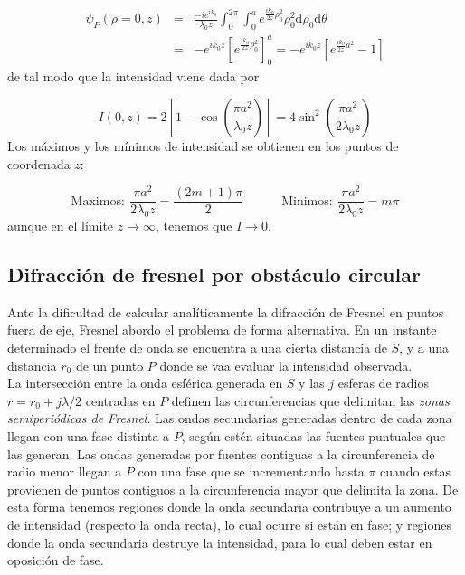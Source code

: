 \documentclass[12pt,a4paper]{book}
\numberwithin{equation}{section}
\numberwithin{figure}{section}
\newcommand{\tquad}{\quad \quad \quad}
\newcommand{\parentesis}[1]{\left( #1  \right)}
\newcommand{\ccorchetes}[1]{\left[ #1  \right]}
\newcommand{\D}{\mathrm{d}}
\newcommand{\1}{_{(1)}}
\newcommand{\2}{_{(2)}}
\theoremstyle{definition}
\begin{document}
\begin{eqnarray}
    \psi_P (\rho=0,z) &  =   & \frac{-ie^{ik_0}}{\lambda_0z} \int_0^{2\pi} \int_0^a e^{\frac{ik_0}{2z} \rho^2_0} \rho_0^2 \D \rho_0 \D \theta \\&  =  &  -e^{ik_0z} \ccorchetes{e^{\frac{ik_0}{2z}\rho^2_0}}_0^a = - e^{ik_0z }\ccorchetes{e^{\frac{ik_0}{2z}a^2}-1}
\end{eqnarray}
de tal modo que la intensidad viene dada por

\begin{equation}
    I(0,z) = 2 \ccorchetes{1-\cos \parentesis{\frac{\pi a^2}{\lambda_0 z}}} = 4 \sin^2 \parentesis{\frac{\pi a^2}{2 \lambda_0 z}}
\end{equation}
Los máximos y los mínimos de intensidad se obtienen en los puntos de coordenada $z$:

\begin{equation}
  \mathrm{Maximos}: \  \frac{\pi a^2}{2\lambda_0z} = \frac{(2m+1)\pi}{2} \tquad 
  \mathrm{Minimos}: \  \frac{\pi a^2}{2\lambda_0z} = m \pi
\end{equation}
aunque en el límite $z\rightarrow \infty$, tenemos que $I\rightarrow 0$. 


\subsection{Difracción de fresnel por obstáculo circular}

Ante la dificultad de calcular analíticamente la difracción de Fresnel en puntos fuera de eje, Fresnel abordo el problema de forma alternativa. En un instante determinado el frente de onda se encuentra a una cierta distancia de $S$, y a una distancia $r_0$ de un punto $P$ donde se vaa evaluar la intensidad observada. \\ 

La intersección entre la onda esférica generada en $S$ y las $j$ esferas de radios $r=r_0 + j \lambda/2$ centradas en $P$ definen las circunferencias que delimitan las \textit{zonas semiperiódicas de Fresnel}. Las ondas secundarias generadas dentro de cada zona llegan con una fase distinta a $P$, según estén situadas las fuentes puntuales que las generan. Las ondas generadas por fuentes contiguas a la circunferencia de radio menor llegan a $P$ con una fase que se incrementando hasta $\pi$ cuando estas provienen de puntos contiguos a la circunferencia mayor que delimita la zona. De esta forma tenemos regiones donde la onda secundaria contribuye a un aumento de intensidad (respecto la onda recta), lo cual ocurre si están en fase; y regiones donde la onda secundaria destruye la intensidad, para lo cual deben estar en oposición de fase. \\
\end{document}

